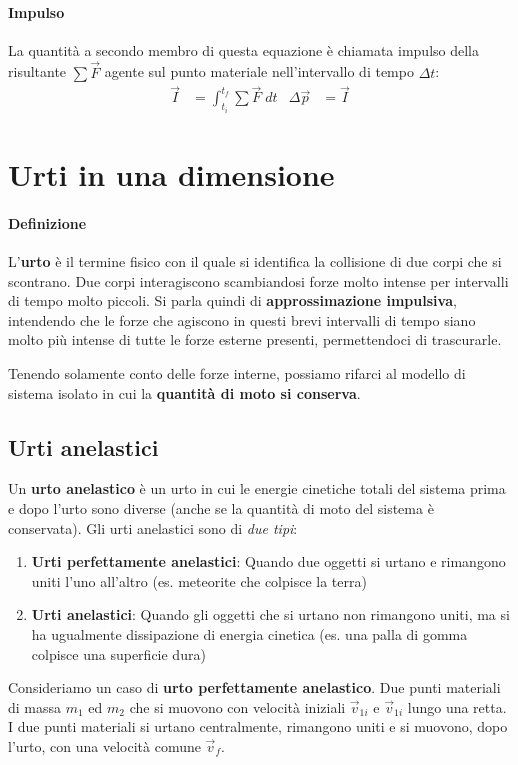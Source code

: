 \documentclass[a4paper,11pt,oneside]{book}
\begin{document}
\paragraph{Impulso} La quantità a secondo membro di questa equazione è chiamata impulso della risultante $\sum \vec{F}$	agente sul punto materiale nell’intervallo di tempo $\Delta t$:
\begin{align*}
    \vec{I} &= \int_{t_i}^{t_f} \sum \vec{F} \; dt & \Delta \vec{p} &= \vec{I}
\end{align*}

\section{Urti in una dimensione}
\paragraph{Definizione} L'\textbf{urto} è il termine fisico con il quale si identifica la collisione di due corpi che si scontrano. 
Due corpi interagiscono scambiandosi forze molto intense per intervalli di tempo molto piccoli. Si parla quindi di \textbf{approssimazione impulsiva}, intendendo che le forze 
che agiscono in questi brevi intervalli di tempo siano molto più intense di tutte le forze esterne presenti, permettendoci di trascurarle.

Tenendo solamente conto delle forze interne, possiamo rifarci al modello di sistema isolato in cui la \textbf{quantità di moto si conserva}.

\subsection{Urti anelastici}
Un \textbf{urto anelastico} è un urto in cui le energie cinetiche totali del sistema prima e dopo l’urto sono diverse (anche se la quantità di moto del sistema è conservata).
Gli urti anelastici sono di \emph{due tipi}:
\begin{enumerate}
    \item \textbf{Urti perfettamente anelastici}: Quando due oggetti si urtano e rimangono uniti l’uno all’altro (es. meteorite che colpisce la terra)
    \item \textbf{Urti anelastici}: Quando gli oggetti che si urtano non rimangono uniti, ma si ha ugualmente dissipazione di energia cinetica (es. una palla di gomma colpisce una superficie dura)
\end{enumerate}


Consideriamo un caso di \textbf{urto perfettamente anelastico}. Due punti materiali di massa $m_1$ ed $m_2$ che si muovono con velocità iniziali $\vec{v}_{1i}$ e $\vec{v}_{1i}$ lungo una retta.
I due punti materiali si urtano centralmente, rimangono uniti e si muovono, dopo l’urto, con una velocità comune $\vec{v}_f$. 
\end{document}
